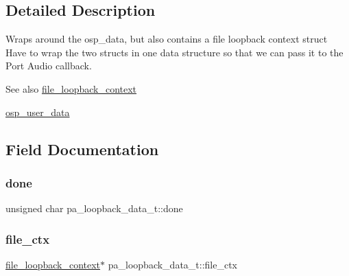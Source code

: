 \subsection{Detailed Description}
Wraps around the osp\+\_\+data, but also contains a file loopback context struct Have to wrap the two structs in one data structure so that we can pass it to the Port Audio callback. 

\begin{DoxySeeAlso}{See also}
\mbox{\hyperlink{port__wrapper_8h_a44712da21c339df7c0735d4bab71a303}{file\+\_\+loopback\+\_\+context}} 

\mbox{\hyperlink{constants_8h_a2d1d78531fe12807c3852488556d5a4b}{osp\+\_\+user\+\_\+data}} 
\end{DoxySeeAlso}


\subsection{Field Documentation}
\mbox{\label{structpa__loopback__data__t_afcc199ddd9516cf9df956370e5c70482}} 
\subsubsection{\texorpdfstring{done}{done}}
{\footnotesize\ttfamily unsigned char pa\+\_\+loopback\+\_\+data\+\_\+t\+::done}

\mbox{\label{structpa__loopback__data__t_a42a73d3f67c2efae2ed630e67aa8fce9}} 
\subsubsection{\texorpdfstring{file\+\_\+ctx}{file\_ctx}}
{\footnotesize\ttfamily \mbox{\hyperlink{port__wrapper_8h_a44712da21c339df7c0735d4bab71a303}{file\+\_\+loopback\+\_\+context}}$\ast$ pa\+\_\+loopback\+\_\+data\+\_\+t\+::file\+\_\+ctx}

\mbox{\label{structpa__loopback__data__t_ac17ae97f5292d3ce42b8f35481df55e0}} 
